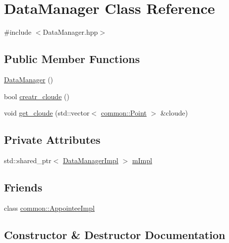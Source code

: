 \hypertarget{classDataManager}{}\section{Data\+Manager Class Reference}
\label{classDataManager}


{\ttfamily \#include $<$Data\+Manager.\+hpp$>$}

\subsection*{Public Member Functions}
\begin{DoxyCompactItemize}
\item 
\mbox{\hyperlink{classDataManager_ac2eec7fa355109eda41308e1de76d2a8}{Data\+Manager}} ()
\item 
bool \mbox{\hyperlink{classDataManager_a979d747ea8548e6a578cd5b1df10734e}{creatr\+\_\+cloude}} ()
\item 
void \mbox{\hyperlink{classDataManager_a86a781c3314235da186b0e4cb31d7e98}{get\+\_\+cloude}} (std\+::vector$<$ \mbox{\hyperlink{structcommon_1_1Point}{common\+::\+Point}} $>$ \&cloude)
\end{DoxyCompactItemize}
\subsection*{Private Attributes}
\begin{DoxyCompactItemize}
\item 
std\+::shared\+\_\+ptr$<$ \mbox{\hyperlink{classDataManagerImpl}{Data\+Manager\+Impl}} $>$ \mbox{\hyperlink{classDataManager_a3ff21b9e53039b8e8a3ebc953eaca2f8}{m\+Impl}}
\end{DoxyCompactItemize}
\subsection*{Friends}
\begin{DoxyCompactItemize}
\item 
class \mbox{\hyperlink{classDataManager_a08bca24b08df51759eafe2bf56bd4f3f}{common\+::\+Appointee\+Impl}}
\end{DoxyCompactItemize}


\subsection{Constructor \& Destructor Documentation}
\mbox{\label{classDataManager_ac2eec7fa355109eda41308e1de76d2a8}} 

